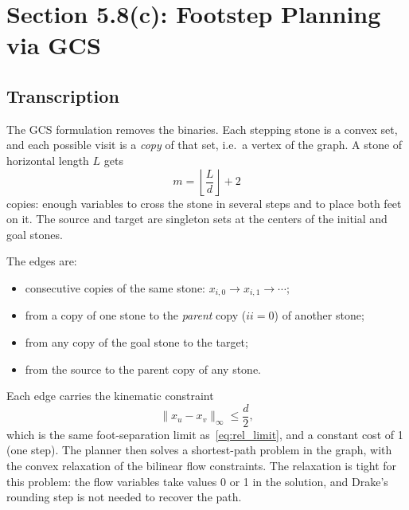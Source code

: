 \documentclass[11pt]{article}
\begin{document}
\section{Section 5.8(c): Footstep Planning via GCS}

\subsection{Transcription}

The GCS formulation removes the binaries.  Each stepping stone is a convex
set, and each possible visit is a \emph{copy} of that set, i.e.\ a vertex of
the graph.  A stone of horizontal length $L$ gets
\begin{equation}
m=\left\lfloor \frac{L}{d}\right\rfloor+2
\end{equation}
copies: enough variables to cross the stone in several steps and to place both
feet on it.  The source and target are singleton sets at the centers of the
initial and goal stones.

The edges are:
\begin{itemize}[leftmargin=1.5em]
  \item consecutive copies of the same stone: $x_{i,0}\to x_{i,1}\to\cdots$;
  \item from a copy of one stone to the \emph{parent} copy ($ii=0$) of another
        stone;
  \item from any copy of the goal stone to the target;
  \item from the source to the parent copy of any stone.
\end{itemize}
Each edge carries the kinematic constraint
\begin{equation}
\|x_u-x_v\|_\infty\le \frac{d}{2},
\end{equation}
which is the same foot-separation limit as~\eqref{eq:rel_limit}, and a constant
cost of 1 (one step).  The planner then solves a shortest-path problem in the
graph, with the convex relaxation of the bilinear flow constraints.  The
relaxation is tight for this problem: the flow variables take values 0 or 1 in
the solution, and Drake's rounding step is not needed to recover the path.
\end{document}
